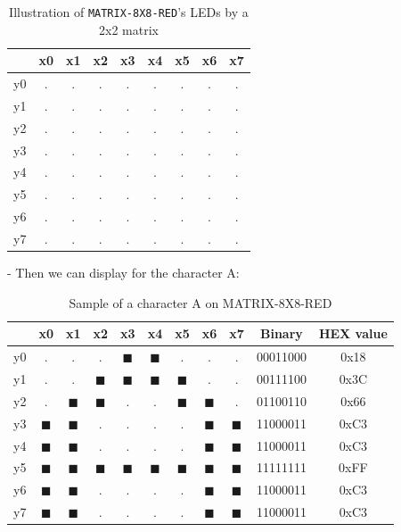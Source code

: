 \begin{table}[H]
\centering
\caption{Illustration of \texttt{MATRIX-8X8-RED}'s LEDs by a 2x2 matrix}
\begin{tabular}{c|cccccccc}
    & x0 & x1 & x2 & x3 & x4 & x5 & x6 & x7 \\ \hline
y0 & . & . & . & . & . & . & . & . \\
y1 & . & . & . & . & . & . & . & . \\
y2 & . & . & . & . & . & . & . & . \\
y3 & . & . & . & . & . & . & . & . \\
y4 & . & . & . & . & . & . & . & . \\
y5 & . & . & . & . & . & . & . & . \\
y6 & . & . & . & . & . & . & . & . \\
y7 & . & . & . & . & . & . & . & . \\
\end{tabular}
\end{table}

- Then we can display for the character A:

\begin{table}[H]
\centering
\caption{Sample of a character A on MATRIX-8X8-RED}
\begin{tabular}{c|cccccccc|cc}
    & x0 & x1 & x2 & x3 & x4 & x5 & x6 & x7 & Binary & HEX value\\ \hline
y0 & . & . & . & $\blacksquare$ & $\blacksquare$ & . & . & . & 00011000 & 0x18\\
y1 & . & . & $\blacksquare$ & $\blacksquare$ & $\blacksquare$ & $\blacksquare$ & . & . & 00111100 & 0x3C\\
y2 & . & $\blacksquare$ & $\blacksquare$ & . & . & $\blacksquare$ & $\blacksquare$ & . & 01100110 & 0x66\\
y3 & $\blacksquare$ & $\blacksquare$ & . & . & . & . & $\blacksquare$ & $\blacksquare$ & 11000011 & 0xC3\\
y4 & $\blacksquare$ & $\blacksquare$ & . & . & . & . & $\blacksquare$ & $\blacksquare$ & 11000011 & 0xC3\\
y5 & $\blacksquare$ & $\blacksquare$ & $\blacksquare$ & $\blacksquare$ & $\blacksquare$ & $\blacksquare$ & $\blacksquare$ & $\blacksquare$ & 11111111 & 0xFF\\
y6 & $\blacksquare$ & $\blacksquare$ & . & . & . & . & $\blacksquare$ & $\blacksquare$ & 11000011 & 0xC3\\
y7 & $\blacksquare$ & $\blacksquare$ & . & . & . & . & $\blacksquare$ & $\blacksquare$ & 11000011 & 0xC3\\
\end{tabular}
\end{table}

